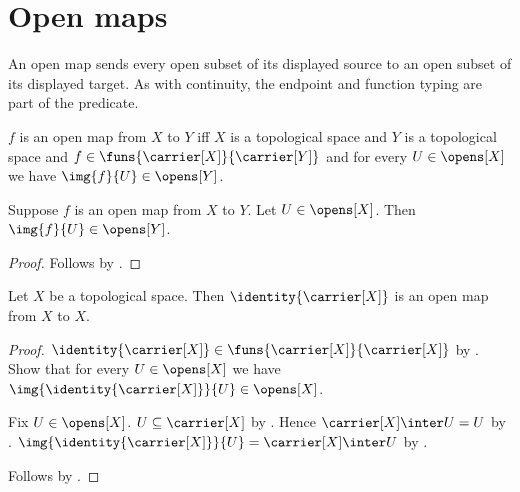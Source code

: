 \section{Open maps}



An open map sends every open subset of its displayed source to an open subset
of its displayed target.  As with continuity, the endpoint and function
typing are part of the predicate.

\begin{definition}\label{open_map}
    $f$ is an open map from $X$ to $Y$ iff
        $X$ is a topological space and
        $Y$ is a topological space and
        $f\in\funs{\carrier[X]}{\carrier[Y]}$ and
        for every $U\in\opens[X]$ we have $\img{f}{U}\in\opens[Y]$.
\end{definition}

\begin{classification}\label{open_map_image_open}
    Suppose $f$ is an open map from $X$ to $Y$.
    Let $U\in\opens[X]$.
    Then $\img{f}{U}\in\opens[Y]$.
\end{classification}
\begin{proof}
    Follows by .
\end{proof}

\begin{theorem}\label{identity_is_open_map}
    Let $X$ be a topological space.
    Then $\identity{\carrier[X]}$ is an open map from $X$ to $X$.
\end{theorem}
\begin{proof}
    $\identity{\carrier[X]}\in
        \funs{\carrier[X]}{\carrier[X]}$ by
        .
    Show that for every $U\in\opens[X]$ we have
        $\img{\identity{\carrier[X]}}{U}\in\opens[X]$.
    \begin{subproof}
        Fix $U\in\opens[X]$.
        $U\subseteq\carrier[X]$ by .
        Hence $\carrier[X]\inter U=U$ by
            .
        $\img{\identity{\carrier[X]}}{U}
            =\carrier[X]\inter U$ by .
    \end{subproof}
    Follows by .
\end{proof}

